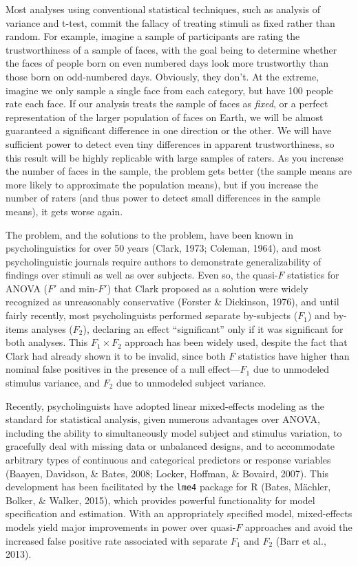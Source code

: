 \documentclass[
  english,
  doc,floatsintext]{apa6}
\begin{document}
Most analyses using conventional statistical techniques, such as analysis of variance and t-test, commit the fallacy of treating stimuli as fixed rather than random. For example, imagine a sample of participants are rating the trustworthiness of a sample of faces, with the goal being to determine whether the faces of people born on even numbered days look more trustworthy than those born on odd-numbered days. Obviously, they don't. At the extreme, imagine we only sample a single face from each category, but have 100 people rate each face. If our analysis treats the sample of faces as \emph{fixed}, or a perfect representation of the larger population of faces on Earth, we will be almost guaranteed a significant difference in one direction or the other. We will have sufficient power to detect even tiny differences in apparent trustworthiness, so this result will be highly replicable with large samples of raters. As you increase the number of faces in the sample, the problem gets better (the sample means are more likely to approximate the population means), but if you increase the number of raters (and thus power to detect small differences in the sample means), it gets worse again.

The problem, and the solutions to the problem, have been known in psycholinguistics for over 50 years (Clark, 1973; Coleman, 1964), and most psycholinguistic journals require authors to demonstrate generalizability of findings over stimuli as well as over subjects. Even so, the quasi-\(F\) statistics for ANOVA (\(F'\) and min-\(F'\)) that Clark proposed as a solution were widely recognized as unreasonably conservative (Forster \& Dickinson, 1976), and until fairly recently, most psycholinguists performed separate by-subjects (\(F_1\)) and by-items analyses (\(F_2\)), declaring an effect \enquote{significant} only if it was significant for both analyses. This \(F_1 \times F_2\) approach has been widely used, despite the fact that Clark had already shown it to be invalid, since both \(F\) statistics have higher than nominal false positives in the presence of a null effect---\(F_1\) due to unmodeled stimulus variance, and \(F_2\) due to unmodeled subject variance.

Recently, psycholinguists have adopted linear mixed-effects modeling as the standard for statistical analysis, given numerous advantages over ANOVA, including the ability to simultaneously model subject and stimulus variation, to gracefully deal with missing data or unbalanced designs, and to accommodate arbitrary types of continuous and categorical predictors or response variables (Baayen, Davidson, \& Bates, 2008; Locker, Hoffman, \& Bovaird, 2007). This development has been facilitated by the \texttt{lme4} package for R (Bates, Mächler, Bolker, \& Walker, 2015), which provides powerful functionality for model specification and estimation. With an appropriately specified model, mixed-effects models yield major improvements in power over quasi-\(F\) approaches and avoid the increased false positive rate associated with separate \(F_1\) and \(F_2\) (Barr et al., 2013).
\end{document}
